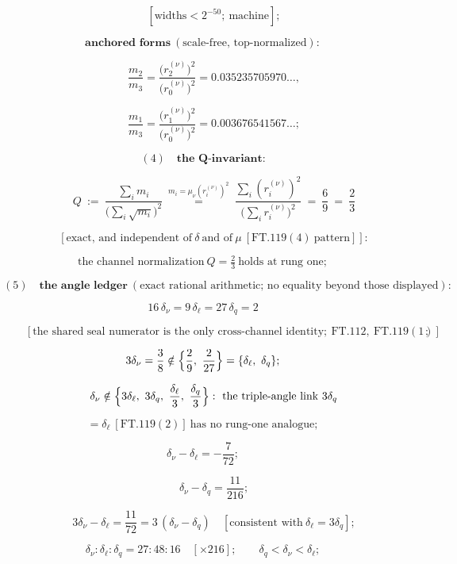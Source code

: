 \[
\qquad [\text{widths}<2^{-50};\ \text{machine}];
\]

\[
\textbf{anchored forms}\ (\text{scale-free, top-normalized}):
\]

\[
\qquad \frac{m_2}{m_3}=\frac{\bigl(r_2^{(\nu)}\bigr)^2}{\bigl(r_0^{(\nu)}\bigr)^2}=0.035235705970\ldots,
\]

\[
\qquad \frac{m_1}{m_3}=\frac{\bigl(r_1^{(\nu)}\bigr)^2}{\bigl(r_0^{(\nu)}\bigr)^2}=0.003676541567\ldots;
\]

\[
(4)\quad\textbf{the Q-invariant:}
\]

\[
\qquad Q\ :=\ \frac{\sum_im_i}{\bigl(\sum_i\sqrt{m_i}\bigr)^2}\ \overset{m_i=\mu_\nu(r_i^{(\nu)})^2}{=}\ \frac{\sum_i(r_i^{(\nu)})^2}{\bigl(\sum_ir_i^{(\nu)}\bigr)^2}\ =\ \frac69\ =\ \frac23
\]

\[
\qquad [\text{exact, and independent of}\ \delta\ \text{and of}\ \mu\ [\mathrm{FT.119}(4)\ \text{pattern}]]:
\]

\[
\text{the channel normalization}\ Q=\tfrac23\ \text{holds at rung one};
\]

\[
(5)\quad\textbf{the angle ledger}\ (\text{exact rational arithmetic; no equality beyond those displayed}):
\]

\[
16\,\delta_\nu=9\,\delta_\ell=27\,\delta_q=2
\]

\[
\qquad [\text{the shared seal numerator is the only cross-channel identity};\ \mathrm{FT.112},\ \mathrm{FT.119}(1)];
\]

\[
3\delta_\nu=\frac38\notin\Bigl\{\frac29,\ \frac2{27}\Bigr\}=\{\delta_\ell,\ \delta_q\};
\]

\[
\qquad \delta_\nu\notin\Bigl\{3\delta_\ell,\ 3\delta_q,\ \frac{\delta_\ell}3,\ \frac{\delta_q}3\Bigr\}:\ \text{the triple-angle link}\ 3\delta_q
\]

\[
= \delta_\ell\ [\mathrm{FT.119}(2)]\ \text{has no rung-one analogue};
\]

\[
\delta_\nu-\delta_\ell=-\frac7{72};
\]

\[
\qquad \delta_\nu-\delta_q=\frac{11}{216};
\]

\[
\qquad 3\delta_\nu-\delta_\ell=\frac{11}{72}=3\,(\delta_\nu-\delta_q)\quad[\text{consistent with}\ \delta_\ell=3\delta_q];
\]

\[
\delta_\nu:\delta_\ell:\delta_q=27:48:16\quad[\times216];\qquad\delta_q<\delta_\nu<\delta_\ell;
\]


